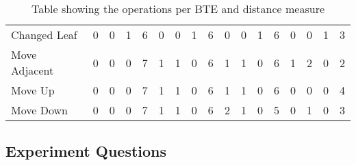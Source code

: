 \begin{table*}
{\begin{tabular}{lcccccccccccccccc}
            Changed Leaf         & 0      & 0   & 1      & 6     & 0      & 0   & 1      & 6     & 0      & 0   & 1      & 6     & 0      & 0   & 1      & 3     \\
            Move Adjacent        & 0      & 0   & 0      & 7     & 1      & 1   & 0      & 6     & 1      & 1   & 0      & 6     & 1      & 2   & 0      & 2     \\
            Move Up              & 0      & 0   & 0      & 7     & 1      & 1   & 0      & 6     & 1      & 1   & 0      & 6     & 0      & 0   & 0      & 4     \\
            Move Down            & 0      & 0   & 0      & 7     & 1      & 1   & 0      & 6     & 2      & 1   & 0      & 5     & 0      & 1   & 0      & 3     \\
            \bottomrule
        \end{tabular}

    }
    \caption{Table showing the operations per BTE and distance measure}
\end{table*}






\subsection{Experiment Questions}
\label{app:exp-questions}








